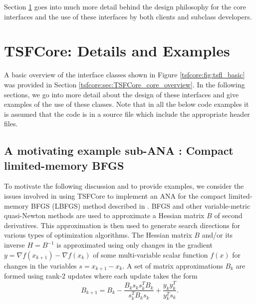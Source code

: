 Section {}\ref{tsfcore:sec:TSFCore_Details} goes into much more detail
behind the design philosophy for the core interfaces and the use of
these interfaces by both clients and subclass developers.

%
\section{TSFCore: Details and Examples}
\label{tsfcore:sec:TSFCore_Details}
%

A basic overview of the interface classes shown in Figure
{}\ref{tsfcore:fig:tsfl_basic} was provided in Section
{}\ref{tsfcore:sec:TSFCore_core_overview}.  In the following sections,
we go into more detail about the design of these interfaces and give
examples of the use of these classes.  Note that in all the below code
examples it is assumed that the code is in a source file which include
the appropriate header files.

%
\subsection{A motivating example sub-ANA : Compact limited-memory BFGS}
\label{tsfcore:sec:LBFGS}
%

To motivate the following discussion and to provide examples, we
consider the issues involved in using TSFCore to implement an ANA for
the compact limited-memory BFGS (LBFGS) method described in
{}\cite{ref:byrd_et_all_lbfgs_1994}.  BFGS and other variable-metric
quasi-Newton methods are used to approximate a Hessian matrix $B$ of
second derivatives.  This approximation is then used to generate
search directions for various types of optimization algorithms.  The
Hessian matrix $B$ and/or its inverse $H = B^{-1}$ is approximated
using only changes in the gradient $y = \nabla f(x_{k+1}) - \nabla
f(x_k)$ of some multi-variable scalar function $f(x)$ for changes in
the variables $s = x_{k+1} - x_k$.  A set of matrix approximations
$B_k$ are formed using rank-2 updates where each update takes the form
%
\begin{equation}
B_{k+1} = B_k - \frac{B_k s_k s_k^T B_k}{s_k^T B_k s_k} + \frac{y_k y_k^T}{y_k^T s_k}.
\end{equation}

